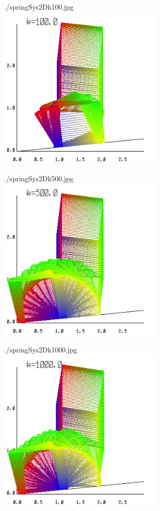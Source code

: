 \documentclass[12pt, a4paper]{article}
\begin{document}
\begin{center}
./springSys2Dk100.jpg\\
\includegraphics[width=8cm]{./springSys2Dk100.jpg}
\end{center} 
\newpage
\begin{center}
./springSys2Dk500.jpg\\
\includegraphics[width=8cm]{./springSys2Dk500.jpg}
\end{center} 

\begin{center}
./springSys2Dk1000.jpg\\
\includegraphics[width=8cm]{./springSys2Dk1000.jpg}
\end{center} 
\end{document}
